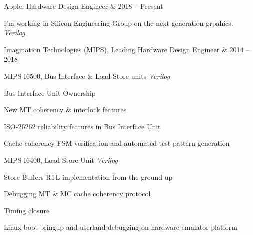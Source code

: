 \documentclass[a4paper]{scrartcl}
\begin{document}
\begin{list1}

\item \begin{tabular1bold} Apple, Hardware Design Engineer & 2018 -- Present \end{tabular1bold}

  \begin{list2}

  \item I'm working in Silicon Engineering Group on the next generation grpahics. \hfill \emph{Verilog}
    
  \end{list2}

\vspace{10pt}

\item \begin{tabular1bold} Imagination Technologies (MIPS), Leading Hardware Design Engineer & 2014 -- 2018 \end{tabular1bold}

  \begin{list2}

  \item MIPS I6500, Bus Interface \& Load Store units \hfill \emph{Verilog}
  
    \begin{list3}
    \item Bus Interface Unit Ownership
    \item New MT coherency \& interlock features
    \item ISO-26262 reliability features in Bus Interface Unit 
    \item Cache coherency FSM verification and automated test pattern generation
    \end{list3}
  
  \end{list2}

  \begin{list2}

  \item MIPS I6400, Load Store Unit \hfill \emph{Verilog}
  
    \begin{list3}
    \item Store Buffers RTL implementation from the ground up
    \item Debugging MT \& MC cache coherency protocol
    \item Timing closure
    \item Linux boot bringup and userland debugging on hardware emulator platform
    \end{list3}
  

\end{list2}
\end{list1}
\end{document}
